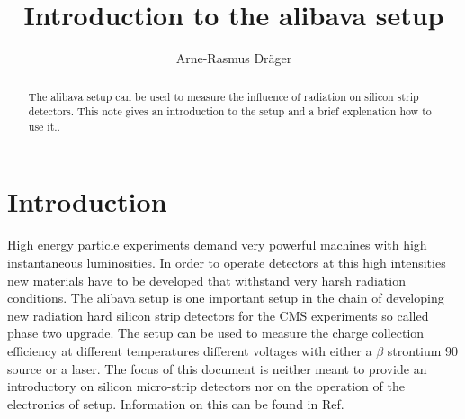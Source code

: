 \documentclass{article}
\begin{document}
\title{Introduction to the alibava setup}
\author{Arne-Rasmus Dr\"ager}

\maketitle

\begin{abstract}
The alibava setup can be used to measure the influence of radiation on silicon strip detectors. This note gives an introduction to the setup and a brief explenation how to use it..
\end{abstract}



\section{Introduction}

High energy particle experiments demand very powerful machines with high instantaneous luminosities. In order to operate detectors at this high intensities new materials have to be developed that withstand very harsh radiation conditions. The alibava setup is one important setup in the chain of developing new radiation hard silicon strip detectors for the CMS experiments so called phase two upgrade. The setup can be used to measure the charge collection efficiency at different temperatures different voltages with either a $\beta$ strontium 90 source or a laser. The focus of this document is neither meant to provide an introductory on silicon micro-strip detectors nor on the operation of the electronics of setup. Information on this can be found in Ref. \cite{Silicon_Microstrip_dectectors_anna_peisert} 
\end{document}
